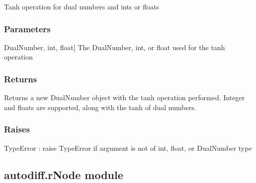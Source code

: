 \documentclass[letterpaper,10pt,english]{sphinxmanual}
\begin{document}
\begin{fulllineitems}
\label{\detokenize{autodiff:autodiff.operators.tanh}}
\pysigstartsignatures
{}
\pysigstopsignatures
\sphinxAtStartPar
Tanh operation for dual numbers and ints or floats


\subsubsection{Parameters}
\label{\detokenize{autodiff:id45}}\begin{description}
\sphinxlineitem{x}{[}DualNumber, int, float{]}
\sphinxAtStartPar
The DualNumber, int, or float used for the tanh operation

\end{description}


\subsubsection{Returns}
\label{\detokenize{autodiff:id46}}\begin{description}
\sphinxAtStartPar
Returns a new DualNumber object with the tanh operation performed. Integer and
floats are supported, along with the tanh of dual numbers.

\end{description}


\subsubsection{Raises}
\label{\detokenize{autodiff:id47}}
\sphinxAtStartPar
TypeError : raise TypeError if argument is not of int, float, or DualNumber type

\end{fulllineitems}



\subsection{autodiff.rNode module}
\label{\detokenize{autodiff:module-autodiff.rNode}}\label{\detokenize{autodiff:autodiff-rnode-module}}
\end{document}
